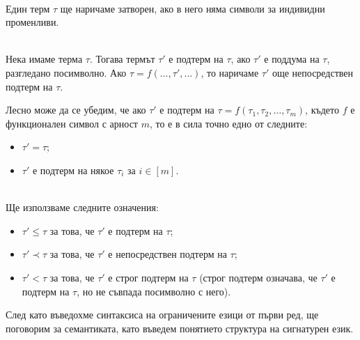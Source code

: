 \documentclass[12pt,twoside,a4paper]{article}
\begin{document}
	\begin{definition}~\\
		\indent Един терм $\tau$ ще наричаме затворен, ако в него няма символи за индивидни променливи.
	\end{definition}
	
	\begin{definitions}\label{def:subterm}~\\
		\indent Нека имаме терма $\tau$. Тогава термът $\tau'$ е подтерм на $\tau$, ако $\tau'$ е поддума на $\tau$, разгледано посимволно. Ако $\tau = f(\dots, \tau', \dots)$, то наричаме $\tau'$ още непосредствен подтерм на $\tau$.
	\end{definitions}
	
	Лесно може да се убедим, че ако $\tau'$ е подтерм на $\tau = f(\tau_1, \tau_2, \dots, \tau_m)$, където $f$ е функционален символ с арност $m$, то е в сила точно едно от следните:
	\begin{itemize}
		\item $\tau' = \tau$;
		\item $\tau'$ е подтерм на някое $\tau_i$ за $i \in [m]$.
	\end{itemize}
	
	\begin{denotations}~\\
		\indent Ще използваме следните означения:
		\begin{itemize}
			\item $\tau' \le \tau$ за това, че $\tau'$ е подтерм на $\tau$;
			\item $\tau' \prec \tau$ за това, че $\tau'$ е непосредствен подтерм на $\tau$;
			\item $\tau' < \tau$ за това, че $\tau'$ е строг подтерм на $\tau$ (строг подтерм означава, че $\tau'$ е подтерм на $\tau$, но не съвпада посимволно с него).
		\end{itemize}
	\end{denotations}
	
	След като въведохме синтаксиса на ограничените езици от първи ред, ще поговорим за семантиката, като въведем понятието структура на сигнатурен език.
	
\end{document}
